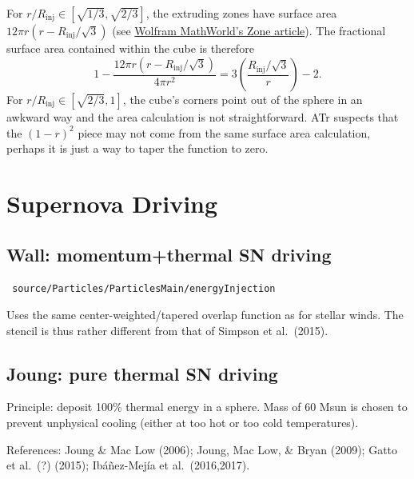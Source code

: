 \documentclass[10pt]{article}
\newcommand*{\mt}{\mathrm}
\begin{document}
For $r/R_\mt{inj} \in [\sqrt{1/3}, \sqrt{2/3}]$, the extruding zones have
surface area $12 \pi r \left(r - R_\mt{inj}/\sqrt{3}\right)$
(see \href{https://mathworld.wolfram.com/Zone.html}{Wolfram MathWorld's Zone article}).
The fractional surface area contained within the cube is therefore
\[
    1 - \frac{12 \pi r \left(r - R_\mt{inj}/\sqrt{3}\right)}{4\pi r^2}
    = 3 \left( \frac{R_\mt{inj}/\sqrt{3}}{r} \right) - 2 .
\]
For $r/R_\mt{inj} \in [\sqrt{2/3}, 1]$, the cube's corners point out of the
sphere in an awkward way and the area calculation is not straightforward.
ATr suspects that the $(1-r)^2$ piece may not come from the same surface area
calculation, perhaps it is just a way to taper the function to zero.


\section{Supernova Driving}

\subsection{Wall: momentum+thermal SN driving}

\texttt{
source/Particles/ParticlesMain/energyInjection
}

Uses the same center-weighted/tapered overlap function as for stellar winds.
The stencil is thus rather different from that of Simpson et al.~(2015).

\subsection{Joung: pure thermal SN driving}

Principle: deposit 100\% thermal energy in a sphere.
Mass of 60 Msun is chosen to prevent unphysical cooling (either at too hot or
too cold temperatures).


References: Joung \& Mac Low (2006); Joung, Mac Low, \& Bryan (2009);
Gatto et al.~(?) (2015); Ib\'{a}\~{n}ez-Mej\'{i}a et al.~(2016,2017).
\end{document}
